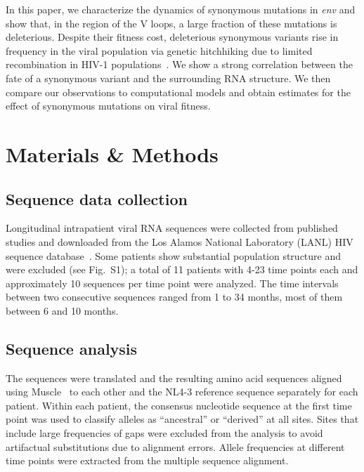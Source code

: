 \documentclass[11pt]{article}
\newcommand{\env}{\textit{env}}
\newcommand{\PCApat}{1}
\begin{document}
In this paper, we characterize the dynamics of synonymous mutations in \env{}
and show that, in the region of the V loops, a large fraction of these mutations
is deleterious. Despite their fitness cost, deleterious synonymous variants
rise in frequency in the viral population via genetic hitchhiking due to limited
recombination in HIV-1 populations~\citep{neher_recombination_2010,
batorsky_estimate_2011}. We show a strong correlation between the fate of a
synonymous variant and the surrounding RNA structure. We then compare our
observations to computational models and obtain estimates for the effect of
synonymous mutations on viral fitness.

\section*{Materials \& Methods}
\subsection*{Sequence data collection}
Longitudinal intrapatient viral RNA sequences were collected from published
studies \citep{shankarappa_consistent_1999, liu_selection_2006,
bunnik_autologous_2008} and downloaded from the Los Alamos National Laboratory
(LANL) HIV sequence database~\citep{LANL2012}. Some patients
show substantial population structure and were excluded (see
Fig.~S\PCApat); a total of 11 patients with 4-23 time points each and
approximately 10 sequences per time point were analyzed. The time intervals
between two consecutive sequences ranged from 1 to 34 months, most of them
between 6 and 10 months.

\subsection*{Sequence analysis}
The sequences were translated and the resulting amino acid sequences aligned
using Muscle~\citep{edgar_muscle:_2004} to each other and the NL4-3 reference
sequence separately for each patient. Within each patient, the consensus
nucleotide sequence at the first time point was used to classify alleles as
``ancestral'' or ``derived'' at all sites. Sites that include large
frequencies of gaps were excluded from the analysis to avoid artifactual
substitutions due to alignment errors. Allele frequencies at different time
points were extracted from the multiple sequence alignment.
\end{document}
